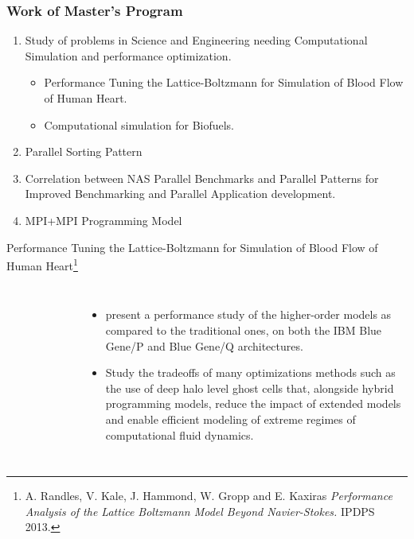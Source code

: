 \begin{frame}
\frametitle{Work of Master's Program}
\begin{enumerate}
    \small \item \small Study of problems in Science and Engineering needing Computational Simulation and performance optimization. 
    \begin{itemize} 
    \item \small Performance Tuning the Lattice-Boltzmann for Simulation of Blood Flow of Human Heart.
    \item \small Computational simulation for Biofuels. 
    \end{itemize}
    \item \small Parallel Sorting Pattern 
    \item \small Correlation between NAS Parallel Benchmarks and Parallel Patterns for Improved Benchmarking and Parallel Application development. 
    \item \small MPI+MPI Programming Model 
\end{enumerate}
\end{frame}


\begin{frame}{Performance Tuning the Lattice-Boltzmann for Simulation of Blood Flow of Human Heart\footnote{\tiny {A. Randles, V. Kale, J. Hammond, W. Gropp and E. Kaxiras} {\it Performance Analysis of the Lattice Boltzmann Model Beyond Navier-Stokes.} IPDPS 2013.}}

\begin{columns} 
\begin{figure}[ht!]
\end{figure}

\begin{itemize}
\footnotesize  \item \footnotesize present a performance study of the higher-order models as compared to the traditional ones, on both the IBM Blue Gene/P and Blue Gene/Q architectures. 
\item \footnotesize Study the tradeoffs of many optimizations methods such as the use of deep halo level ghost cells that, alongside hybrid programming models, reduce the impact of extended models and enable efficient modeling of extreme regimes of computational fluid dynamics. 
\end{itemize} 
\end{columns}

\begin{figure}[ht!]
\centering
\end{figure}

\end{frame}

